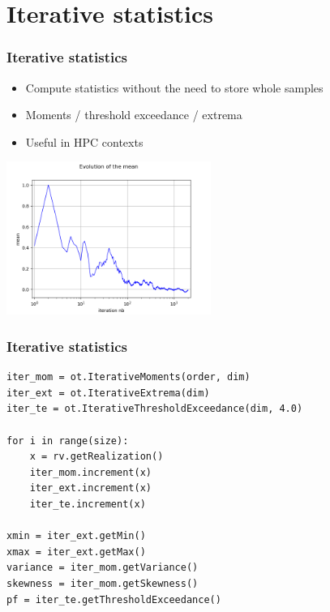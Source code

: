 \documentclass[aspectratio=169]{beamer}
\begin{document}
\section{Iterative statistics}


\begin{frame}[containsverbatim]
\frametitle{Iterative statistics}

\begin{itemize}
\item Compute statistics without the need to store whole samples
\item Moments / threshold exceedance / extrema
\item Useful in HPC contexts
\end{itemize}

\begin{center}
\includegraphics[width=0.5\textwidth]{figures/sphx_glr_plot_iterative_moments_001.png}
\end{center}
\end{frame}

\begin{frame}[containsverbatim]
\frametitle{Iterative statistics}

\lstset{language=python}
\begin{lstlisting}
iter_mom = ot.IterativeMoments(order, dim)
iter_ext = ot.IterativeExtrema(dim)
iter_te = ot.IterativeThresholdExceedance(dim, 4.0)

for i in range(size):
    x = rv.getRealization()
    iter_mom.increment(x)
    iter_ext.increment(x)
    iter_te.increment(x)

xmin = iter_ext.getMin()
xmax = iter_ext.getMax()
variance = iter_mom.getVariance()
skewness = iter_mom.getSkewness()
pf = iter_te.getThresholdExceedance()
\end{lstlisting}


\end{frame}
\end{document}
